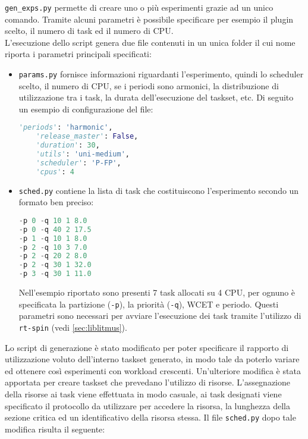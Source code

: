 \begin{appendices}
\noindent \texttt{gen\_exps.py} permette di creare uno o più esperimenti grazie ad un unico comando. Tramite alcuni parametri è possibile specificare per esempio il plugin scelto, il numero di task ed il numero di CPU.\\

\noindent L'esecuzione dello script genera due file contenuti in un unica folder il cui nome riporta i parametri principali specificati:

\begin{itemize}
	\item \texttt{params.py} fornisce informazioni riguardanti l'esperimento, quindi lo scheduler scelto, il numero di CPU, se i periodi sono armonici, la distribuzione di utilizzazione tra i task, la durata dell'esecuzione del taskset, etc. Di seguito un esempio di configurazione del file:\\

 \begin{lstlisting}[frame=single,language=Python]  % Start your code-block
	'periods': 'harmonic',
	'release_master': False,
	'duration': 30,
 	'utils': 'uni-medium',
 	'scheduler': 'P-FP',
 	'cpus': 4
\end{lstlisting}

	\item \texttt{sched.py} contiene la lista di task che costituiscono l'esperimento secondo un formato ben preciso: \\

 \begin{lstlisting}[frame=single,language=Python]  % Start your code-block
-p 0 -q 10 1 8.0
-p 0 -q 40 2 17.5
-p 1 -q 10 1 8.0
-p 2 -q 10 3 7.0
-p 2 -q 20 2 8.0
-p 2 -q 30 1 32.0
-p 3 -q 30 1 11.0
\end{lstlisting}

Nell'esempio riportato sono presenti 7 task allocati su 4 CPU, per ognuno è specificata la partizione (\texttt{-p}), la priorità (\texttt{-q}), WCET e periodo. Questi parametri sono necessari per avviare l'esecuzione dei task tramite l'utilizzo di \texttt{rt-spin} (vedi \ref{sec:liblitmus}).

 \end{itemize}

 \noindent Lo script di generazione è stato modificato per poter specificare il rapporto di utilizzazione voluto dell'interno taskset generato, in modo tale da poterlo variare ed ottenere così esperimenti con workload crescenti. Un'ulteriore modifica è stata apportata per creare taskset che prevedano l'utilizzo di risorse. L'assegnazione della risorse ai task viene effettuata in modo casuale, ai task designati viene specificato il protocollo da utilizzare per accedere la risorsa, la lunghezza della sezione critica ed un identificativo della risorsa stessa. Il file \texttt{sched.py} dopo tale modifica risulta il seguente:\\


\end{appendices}
